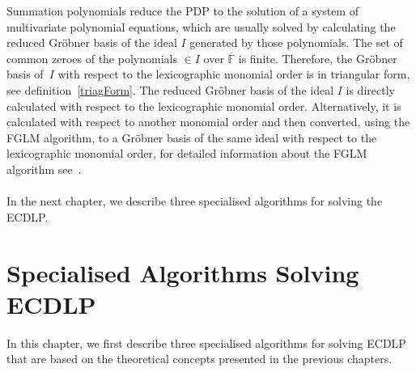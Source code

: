 \documentclass[thesis=M,english]{FITthesis}[2012/10/20]
\theoremstyle{remark}
\theoremstyle{definition}
\begin{document}
\noindent Summation polynomials reduce the PDP to the solution of a system of multivariate polynomial equations, which are usually solved by calculating the reduced Gröbner basis of the ideal $I$ generated by those polynomials. The set of common zeroes of the polynomials $\in I$ over $\overline{\mathbb{F}}$ is finite. Therefore, the Gröbner basis of~$I$ with respect to the lexicographic monomial order is in triangular form, see definition~\ref{triagForm}. The reduced Gröbner basis of the ideal $I$ is directly calculated with respect to the lexicographic monomial order. Alternatively, it is calculated with respect to another monomial order and then converted, using the FGLM algorithm, to a Gröbner basis of the same ideal with respect to the lexicographic monomial order, for detailed information about the FGLM algorithm see~\cite{FGLM}. \\ \\
\noindent In the next chapter, we describe three specialised algorithms for solving the ECDLP. 
\chapter{Specialised Algorithms Solving ECDLP}
\label{specAlg}
In this chapter, we first describe three specialised algorithms for solving ECDLP that are based on the theoretical concepts presented in the previous chapters. 
\end{document}
